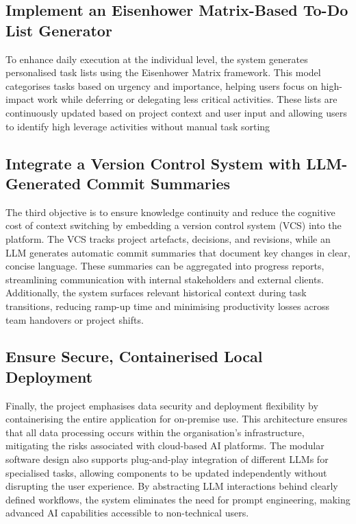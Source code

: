 \documentclass{report}
\begin{document}
\subsection{Implement an Eisenhower Matrix-Based To-Do List Generator}
To enhance daily execution at the individual level, the system generates personalised task lists using the Eisenhower Matrix framework. 
This model categorises tasks based on urgency and importance, helping users focus on high-impact work while deferring or delegating less critical activities. 
These lists are continuously updated based on project context and user input and allowing users to identify high leverage activities without manual task sorting

\subsection{Integrate a Version Control System with LLM-Generated Commit Summaries}
The third objective is to ensure knowledge continuity and reduce the cognitive cost of context switching by embedding a version control system (VCS) into the platform. 
The VCS tracks project artefacts, decisions, and revisions, while an LLM generates automatic commit summaries that document key changes in clear, concise language. 
These summaries can be aggregated into progress reports, streamlining communication with internal stakeholders and external clients. 
Additionally, the system surfaces relevant historical context during task transitions, reducing ramp-up time and minimising productivity losses across team handovers or project shifts.
\subsection{Ensure Secure, Containerised Local Deployment}
Finally, the project emphasises data security and deployment flexibility by containerising the entire application for on-premise use. 
This architecture ensures that all data processing occurs within the organisation's infrastructure, mitigating the risks associated with cloud-based AI platforms. 
The modular software design also supports plug-and-play integration of different LLMs for specialised tasks, allowing components to be updated independently without disrupting the user experience. 
By abstracting LLM interactions behind clearly defined workflows, the system eliminates the need for prompt engineering, making advanced AI capabilities accessible to non-technical users.
\end{document}
